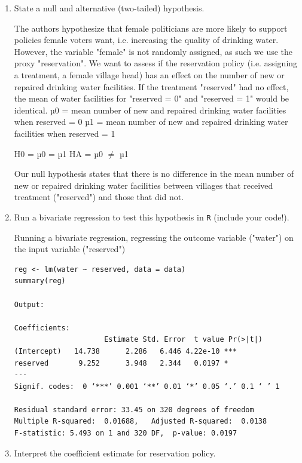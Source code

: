 \documentclass[12pt,letterpaper]{article}
\begin{document}
\newpage
\begin{enumerate}
	\item [(a)] State a null and alternative (two-tailed) hypothesis. 
	
	The authors hypothesize that female politicians are more likely to support policies female voters want, i.e. increasing the quality of drinking water. However, the variable "female" is not randomly assigned, as such we use the proxy "reservation". We want to assess if the reservation policy (i.e. assigning a treatment, a female village head) has an effect on the number of new or repaired drinking water facilities. If the treatment "reserved" had no effect, the mean of water facilities for "reserved = 0" and "reserved = 1" would be identical. 
	µ0 = mean number of new and repaired drinking water facilities when reserved = 0
	µ1 = mean number of new and repaired drinking water facilities when reserved = 1
	
	
	H0 = µ0 = µ1
	HA = µ0 $\neq$  µ1
	
	Our null hypothesis states that there is no difference in the mean number of new or repaired drinking water facilities between villages that received treatment ("reserved") and those that did not.
	
	\vspace{4 cm}
	\item [(b)] Run a bivariate regression to test this hypothesis in \texttt{R} (include your code!).
	
	Running a bivariate regression, regressing the outcome variable ("water") on the input variable ("reserved")
	
\begin{verbatim}
reg <- lm(water ~ reserved, data = data)
summary(reg)

Output: 

Coefficients:
                     Estimate Std. Error  t value Pr(>|t|)    
(Intercept)   14.738      2.286   6.446 4.22e-10 ***
reserved       9.252      3.948   2.344   0.0197 *  
---
Signif. codes:  0 ‘***’ 0.001 ‘**’ 0.01 ‘*’ 0.05 ‘.’ 0.1 ‘ ’ 1

Residual standard error: 33.45 on 320 degrees of freedom
Multiple R-squared:  0.01688,	Adjusted R-squared:  0.0138 
F-statistic: 5.493 on 1 and 320 DF,  p-value: 0.0197

\end{verbatim}
	
	
	
	\vspace{2cm}
	\item [(c)] Interpret the coefficient estimate for reservation policy. 
	

\end{enumerate}
\end{document}
